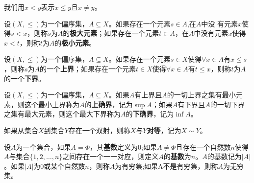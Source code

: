 \documentclass{beamer}
\begin{document}
\begin{CJK*}{UTF8}{gbsn}
\begin{frame}
    我们用$x<y$表示$x\leq y$且$x\neq y$。
    \begin{Def}
    设$(X,\leq)$为一个偏序集，$A\subseteq X$。如果存在一个元素$s\in A$,在$A$中没
    有元素$x$使得$s < x$，则称$s$为$A$的{\bfseries 极大元素}；如果存在一个元素$t\in A$，在$A$中没有元素$x$使得$x < t$，则称$t$为$A$的{\bfseries 极小元素}。
  \end{Def}
\end{frame}

\begin{frame}
      \begin{Def}
    设$(X,\leq)$为一个偏序集，$A\subseteq X$。如果存在一个元素$s\in X$使得$\forall x \in A$有$x \leq s$，则称$s$为$A$的一个{\bfseries 上界}；如果存在一个元素$t\in X$使得$\forall x \in A$有$t \leq x$，则称$t$为$A$的一个{\bfseries 下界}。
  \end{Def}
\end{frame}

\begin{frame}
      \begin{Def}
      设$(X,\leq)$为一个偏序集，$A\subseteq X$。如果$A$有上界且$A$的一切上界之集有最小元素，则这个最小上界称为$A$的{\bfseries 上确界}，记为$\sup A$；如果$A$有下界且$A$的一切下界之集有最大元素，则这个最大下界称为$A$的{\bfseries 下确界}，记为$\inf A$。
  \end{Def}
\end{frame}

\begin{frame}
    \begin{Def}
    如果从集合$X$到集合$Y$存在一个双射，则称$X$与$Y${\bfseries 对等}，记为$X \sim Y$。
  \end{Def}

  \begin{Def}
设$A$为一个集合，如果$A=\Phi$，其{\bfseries 基数}定义为$0$;如果$A \neq \Phi$且存在一个自然数$n$使得$A$与集合$\{1,2,\ldots, n\}$之间存在一个一一对应，则定义$A$的{\bfseries 基数}为$n$。$A$的基数记为$|A|$。如果$|A|$为0或某个自然数$n$，则称$A$为有穷集;如果A不是有穷集，则称$A$为无穷集。   
  \end{Def}


\end{frame}
\end{CJK*}
\end{document}
